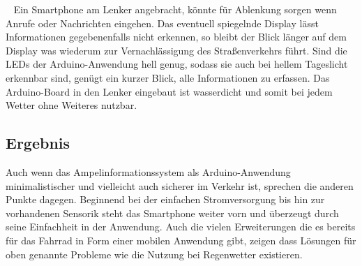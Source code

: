 \begin{description}[leftmargin=0.7cm,style=nextline]
  \item[Verkehrssicherheit] ~ Ein \gls{Smartphone} am Lenker angebracht, könnte für Ablenkung sorgen wenn Anrufe oder Nachrichten eingehen. Das eventuell spiegelnde Display lässt Informationen gegebenenfalls nicht erkennen, so bleibt der Blick länger auf dem Display was wiederum zur Vernachlässigung des Straßenverkehrs führt. Sind die \glspl{LED} der \gls{Arduino}-Anwendung hell genug, sodass sie auch bei hellem Tageslicht erkennbar sind, genügt ein kurzer Blick, alle Informationen zu erfassen. Das \gls{Arduino}-Board in den Lenker eingebaut ist wasserdicht und somit bei jedem Wetter ohne Weiteres nutzbar.\\ 
\end{description}
\subsection*{Ergebnis}  
Auch wenn das Ampelinformationssystem als \gls{Arduino}-Anwendung minimalistischer und vielleicht auch sicherer im Verkehr ist, sprechen die anderen Punkte dagegen. Beginnend bei der einfachen Stromversorgung bis hin zur vorhandenen Sensorik steht das \gls{Smartphone} weiter vorn und überzeugt durch seine Einfachheit in der Anwendung. Auch die vielen Erweiterungen die es bereits für das Fahrrad in Form einer mobilen Anwendung gibt, zeigen dass Lösungen für oben genannte Probleme wie die Nutzung bei Regenwetter existieren. 
